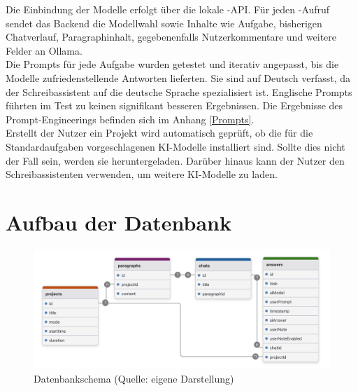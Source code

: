 \documentclass[../main.tex]{subfiles}
\begin{document}
Die Einbindung der Modelle erfolgt über die lokale -API. Für jeden -Aufruf sendet das Backend die Modellwahl sowie Inhalte wie Aufgabe, bisherigen Chatverlauf, 
Paragraphinhalt, gegebenenfalls Nutzerkommentare und weitere Felder an Ollama.\\ Die Prompts für jede Aufgabe wurden getestet und iterativ angepasst, bis die Modelle zufriedenstellende Antworten 
lieferten. Sie sind auf Deutsch verfasst, da der Schreibassistent auf die deutsche Sprache spezialisiert ist. Englische Prompts führten im Test zu keinen signifikant besseren Ergebnissen. Die Ergebnisse des Prompt-Engineerings befinden sich im Anhang \ref{Prompts}.\\
Erstellt der Nutzer ein Projekt wird automatisch geprüft, ob die für die Standardaufgaben vorgeschlagenen KI-Modelle installiert sind. Sollte dies nicht der Fall sein, werden sie heruntergeladen.
Darüber hinaus kann der Nutzer den Schreibassistenten verwenden, um weitere KI-Modelle zu laden. 

\section{Aufbau der Datenbank}
\begin{figure}[h!]
  \includegraphics[scale=0.14]{bilder/Datenbank.png}
  \caption{Datenbankschema (Quelle: eigene Darstellung)}
  \label{fig:data}
\end{figure}
\end{document}
